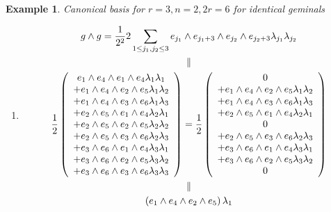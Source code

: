 \documentclass[aps,preprint]{revtex4}%
\newtheorem{example}[theorem]{Example}
\begin{document}
\begin{example}
Canonical basis for $r=3,n=2,2r=6$ for identical geminals

\begin{enumerate}
\item
\begin{gather}
g\wedge g=\frac{1}{2^{2}}2\sum_{1\leq j_{1},j_{2}\leq3}e_{j_{1}}\wedge
e_{j_{1}+3}\wedge e_{j_{2}}\wedge e_{j_{2}+3}\lambda_{j_{1}}\lambda_{j_{2}}\\
\parallel\\
\frac{1}{2}\left(
\begin{array}
[c]{c}%
e_{1}\wedge e_{4}\wedge e_{1}\wedge e_{4}\lambda_{1}\lambda_{1}\\
+e_{1}\wedge e_{4}\wedge e_{2}\wedge e_{5}\lambda_{1}\lambda_{2}\\
+e_{1}\wedge e_{4}\wedge e_{3}\wedge e_{6}\lambda_{1}\lambda_{3}\\
+e_{2}\wedge e_{5}\wedge e_{1}\wedge e_{4}\lambda_{2}\lambda_{1}\\
+e_{2}\wedge e_{5}\wedge e_{2}\wedge e_{5}\lambda_{2}\lambda_{2}\\
+e_{2}\wedge e_{5}\wedge e_{3}\wedge e_{6}\lambda_{2}\lambda_{3}\\
+e_{3}\wedge e_{6}\wedge e_{1}\wedge e_{4}\lambda_{3}\lambda_{1}\\
+e_{3}\wedge e_{6}\wedge e_{2}\wedge e_{5}\lambda_{3}\lambda_{2}\\
+e_{3}\wedge e_{6}\wedge e_{3}\wedge e_{6}\lambda_{3}\lambda_{3}%
\end{array}
\right)  =\frac{1}{2}\left(
\begin{array}
[c]{c}%
0\\
+e_{1}\wedge e_{4}\wedge e_{2}\wedge e_{5}\lambda_{1}\lambda_{2}\\
+e_{1}\wedge e_{4}\wedge e_{3}\wedge e_{6}\lambda_{1}\lambda_{3}\\
+e_{2}\wedge e_{5}\wedge e_{1}\wedge e_{4}\lambda_{2}\lambda_{1}\\
0\\
+e_{2}\wedge e_{5}\wedge e_{3}\wedge e_{6}\lambda_{2}\lambda_{3}\\
+e_{3}\wedge e_{6}\wedge e_{1}\wedge e_{4}\lambda_{3}\lambda_{1}\\
+e_{3}\wedge e_{6}\wedge e_{2}\wedge e_{5}\lambda_{3}\lambda_{2}\\
0
\end{array}
\right) \\
\parallel\\
\left(  e_{1}\wedge e_{4}\wedge e_{2}\wedge e_{5}\right)  \lambda_{1}%

\end{gather}
\end{enumerate}
\end{example}
\end{document}

